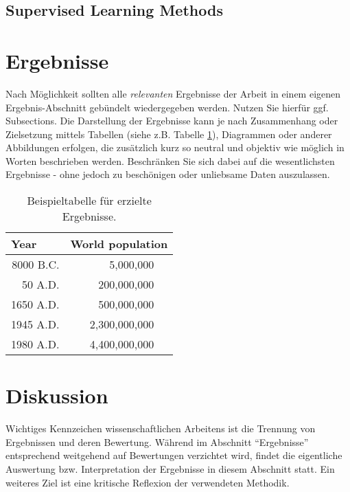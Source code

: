\documentclass{svproc}
\begin{document}
\subsection{Supervised Learning Methods}



\section{Ergebnisse}
%
Nach Möglichkeit sollten alle \textit{relevanten} Ergebnisse der Arbeit in einem eigenen Ergebnis-Abschnitt gebündelt wiedergegeben werden. Nutzen Sie hierfür ggf. Subsections. Die Darstellung der Ergebnisse kann je nach Zusammenhang oder Zielsetzung mittels Tabellen (siehe z.B. Tabelle \ref{tab1}), Diagrammen oder anderer Abbildungen erfolgen, die zusätzlich kurz so neutral und objektiv wie möglich in Worten beschrieben werden. Beschränken Sie sich dabei auf die wesentlichsten Ergebnisse - ohne jedoch zu beschönigen oder unliebsame Daten auszulassen. 

\begin{table}
    \caption{Beispieltabelle für erzielte Ergebnisse.}
    \begin{center}
        \begin{tabular}{r@{\quad}rl}
            \hline
            \multicolumn{1}{l}{\rule{0pt}{12pt}
                   Year}&\multicolumn{2}{l}{World population}\\[2pt]
                                    \hline\rule{0pt}{12pt}
                    8000 B.C.  &     5,000,000& \\
                    50 A.D.  &   200,000,000& \\
                    1650 A.D.  &   500,000,000& \\
                    1945 A.D.  & 2,300,000,000& \\
                    1980 A.D.  & 4,400,000,000& \\[2pt]
                    \hline
        \end{tabular}
    \end{center}
    \label{tab1}
\end{table}
%
%
\section{Diskussion}
%
Wichtiges Kennzeichen wissenschaftlichen Arbeitens ist die Trennung von Ergebnissen und deren Bewertung. Während im Abschnitt ``Ergebnisse'' entsprechend weitgehend auf Bewertungen verzichtet wird, findet die eigentliche Auswertung bzw. Interpretation der Ergebnisse in diesem Abschnitt statt. Ein weiteres Ziel ist eine kritische Reflexion der verwendeten Methodik. 
\end{document}
